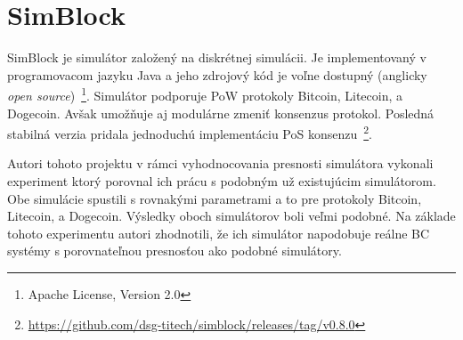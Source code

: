 

\section{SimBlock}

SimBlock je simulátor založený na diskrétnej simulácii. Je implementovaný v programovacom jazyku Java a jeho zdrojový kód je voľne dostupný (anglicky \textit{open source})~\footnote{Apache License, Version 2.0}. Simulátor podporuje PoW protokoly Bitcoin, Litecoin, a Dogecoin. Avšak umožňuje aj modulárne zmeniť konsenzus protokol. Posledná stabilná verzia pridala jednoduchú implementáciu PoS konsenzu~\footnote{\url{https://github.com/dsg-titech/simblock/releases/tag/v0.8.0}}.

Autori tohoto projektu v rámci vyhodnocovania presnosti simulátora vykonali experiment ktorý porovnal ich prácu s podobným už existujúcim simulátorom. Obe simulácie spustili s rovnakými parametrami a to pre protokoly Bitcoin, Litecoin, a Dogecoin. Výsledky oboch simulátorov boli veľmi podobné. Na základe tohoto experimentu autori zhodnotili, že ich simulátor napodobuje reálne BC systémy s porovnateľnou presnosťou ako podobné simulátory.

